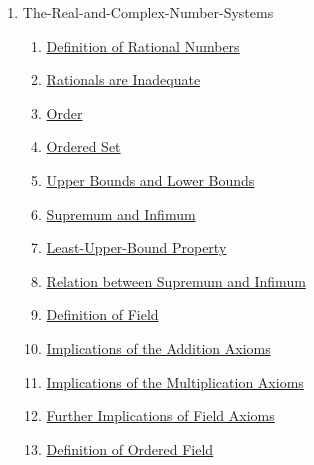 \clearpage
\renewcommand{\notetitle}{Table of Contents}
\label{toc}
\begin{enumerate}

\item The-Real-and-Complex-Number-Systems
\begin{enumerate}
\item \hyperref[202501131947]{Definition of Rational Numbers}
\item \hyperref[202501132004]{Rationals are Inadequate}
\item \hyperref[202501141228]{Order}
\item \hyperref[202501141241]{Ordered Set}
\item \hyperref[202501141250]{Upper Bounds and Lower Bounds}
\item \hyperref[202501141546]{Supremum and Infimum}
\item \hyperref[202501141632]{Least-Upper-Bound Property}
\item \hyperref[202501141654]{Relation between Supremum and Infimum}
\item \hyperref[202501150657]{Definition of Field}
\item \hyperref[202501150717]{Implications of the Addition Axioms}
\item \hyperref[202501150809]{Implications of the Multiplication Axioms}
\item \hyperref[202501152115]{Further Implications of Field Axioms}
\item \hyperref[202501160624]{Definition of Ordered Field}
\end{enumerate}
\end{enumerate}

\newpage
